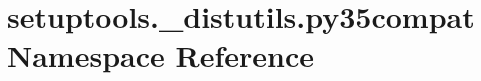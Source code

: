 \hypertarget{namespacesetuptools_1_1__distutils_1_1py35compat}{}\section{setuptools.\+\_\+distutils.\+py35compat Namespace Reference}
\label{namespacesetuptools_1_1__distutils_1_1py35compat}
